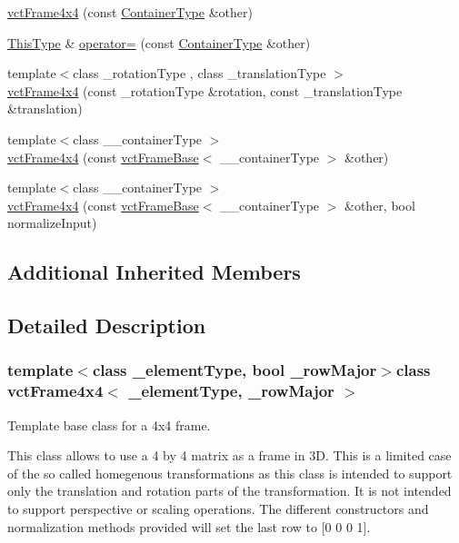 \begin{DoxyCompactItemize}
\item 
\hyperlink{classvct_frame4x4_a6e99def3bd273940c3a50a67d0e2ae7c}{vct\+Frame4x4} (const \hyperlink{classvct_frame4x4_a3174a2ddafc9ae2b74009bab0c2b47c4}{Container\+Type} \&other)
\item 
\hyperlink{classvct_fixed_size_const_matrix_base_a7ec66a96ed7e08ce9ff54093133c9d8d}{This\+Type} \& \hyperlink{classvct_frame4x4_a1a098a9b58af05a8c4478907ddc74503}{operator=} (const \hyperlink{classvct_frame4x4_a3174a2ddafc9ae2b74009bab0c2b47c4}{Container\+Type} \&other)
\item 
{\footnotesize template$<$class \+\_\+rotation\+Type , class \+\_\+translation\+Type $>$ }\\\hyperlink{classvct_frame4x4_aa7c99db4ba56f170f4207fc0b88fc702}{vct\+Frame4x4} (const \+\_\+rotation\+Type \&rotation, const \+\_\+translation\+Type \&translation)
\item 
{\footnotesize template$<$class \+\_\+\+\_\+container\+Type $>$ }\\\hyperlink{classvct_frame4x4_a3566608875acd873ad5f691354deac14}{vct\+Frame4x4} (const \hyperlink{classvct_frame_base}{vct\+Frame\+Base}$<$ \+\_\+\+\_\+container\+Type $>$ \&other)
\item 
{\footnotesize template$<$class \+\_\+\+\_\+container\+Type $>$ }\\\hyperlink{classvct_frame4x4_ade017c77502d3cf628c259b061b48fbe}{vct\+Frame4x4} (const \hyperlink{classvct_frame_base}{vct\+Frame\+Base}$<$ \+\_\+\+\_\+container\+Type $>$ \&other, bool normalize\+Input)
\end{DoxyCompactItemize}
\subsection*{Additional Inherited Members}


\subsection{Detailed Description}
\subsubsection*{template$<$class \+\_\+element\+Type, bool \+\_\+row\+Major$>$class vct\+Frame4x4$<$ \+\_\+element\+Type, \+\_\+row\+Major $>$}

Template base class for a 4x4 frame. 

This class allows to use a 4 by 4 matrix as a frame in 3\+D. This is a limited case of the so called homegenous transformations as this class is intended to support only the translation and rotation parts of the transformation. It is not intended to support perspective or scaling operations. The different constructors and normalization methods provided will set the last row to \mbox{[}0 0 0 1\mbox{]}.


